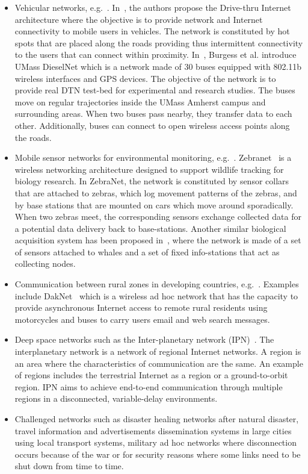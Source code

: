 \begin{itemize}
\item{Vehicular networks, e.g.~\cite{Levine:MaxProp, DriveThru}. In~\cite{DriveThru}, the authors propose the Drive-thru Internet architecture where the objective is to provide network and Internet connectivity
to mobile users in vehicles. The network is constituted by hot spots that are placed along the roads providing thus intermittent connectivity to the users that can
connect within proximity. In~\cite{Levine:MaxProp}, Burgess et al. introduce UMass DieselNet which is a network made of 30 buses equipped with 802.11b wireless interfaces and GPS devices. The objective of the network is to provide real DTN test-bed for experimental and research studies. The buses move on regular trajectories inside the UMass Amherst campus and surrounding areas. When two buses pass nearby, they transfer data to each other. Additionally, buses can connect to open wireless access points
along the roads.}
\item{Mobile sensor networks for environmental monitoring, e.g.~\cite{zebranet02,WirelessInfostation}. Zebranet~\cite{zebranet02} is a wireless networking architecture designed to support wildlife tracking for biology research. In ZebraNet, the network is constituted by sensor collars that are attached to zebras, which log movement patterns of the zebras, and by base stations that are mounted on cars which move around sporadically. When two zebras meet, the corresponding sensors exchange collected data for a potential data delivery back to base-stations. Another similar biological acquisition system has been proposed in~\cite{WirelessInfostation}, where the network is made of a set of sensors attached to whales and a set of fixed info-stations that act as collecting nodes.}
\item{Communication between rural zones in developing countries, e.g.~\cite{Brewer:DTNdeveloping}. Examples include DakNet~\cite{Brewer:DTNdeveloping} which is a wireless ad hoc network that has the capacity to provide asynchronous Internet access to remote rural residents using motorcycles and buses to carry users email and web search messages.}
\item{Deep space networks such as the Inter-planetary network (IPN)~\cite{interplanetary03}. The interplanetary network is a network of regional Internet networks. A region is an area where the characteristics of communication are the same. An example of regions includes the terrestrial Internet as a region or a ground-to-orbit region. IPN aims to achieve end-to-end communication through multiple regions in a disconnected, variable-delay environments.}
\item{Challenged networks such as disaster healing networks after natural disaster, travel information and advertisements dissemination systems in large cities using local transport systems, military ad hoc networks where disconnection occurs because of the war or for security reasons where some links need to be shut down from time to time.}
\end{itemize}

